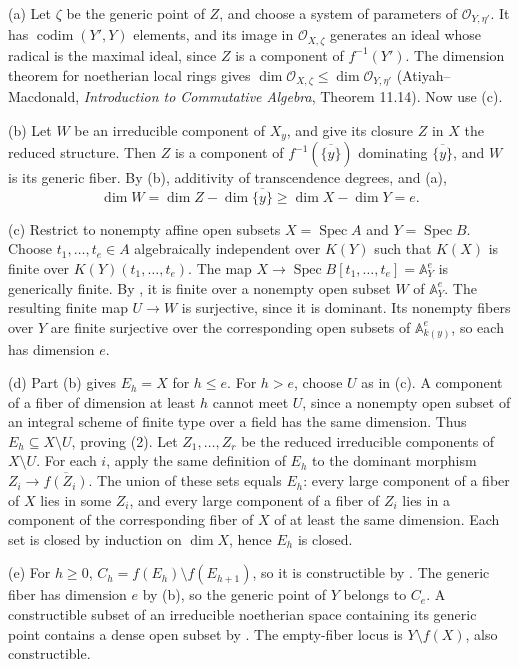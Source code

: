(a) Let $\zeta$ be the generic point of $Z$, and choose a system of parameters of $\mathcal O_{Y,\eta'}$. It has $\operatorname{codim}(Y',Y)$ elements, and its image in $\mathcal O_{X,\zeta}$ generates an ideal whose radical is the maximal ideal, since $Z$ is a component of $f^{-1}(Y')$. The dimension theorem for noetherian local rings gives $\dim\mathcal O_{X,\zeta}\le\dim\mathcal O_{Y,\eta'}$ (Atiyah--Macdonald, \emph{Introduction to Commutative Algebra}, Theorem 11.14). Now use (c).

(b) Let $W$ be an irreducible component of $X_y$, and give its closure $Z$ in $X$ the reduced structure. Then $Z$ is a component of $f^{-1}(\overline{\{y\}})$ dominating $\overline{\{y\}}$, and $W$ is its generic fiber. By (b), additivity of transcendence degrees, and (a),
\[\dim W=\dim Z-\dim\overline{\{y\}}\ge\dim X-\dim Y=e.\]

(c) Restrict to nonempty affine open subsets $X=\operatorname{Spec}A$ and $Y=\operatorname{Spec}B$. Choose $t_1,\ldots,t_e\in A$ algebraically independent over $K(Y)$ such that $K(X)$ is finite over $K(Y)(t_1,\ldots,t_e)$. The map $X\to\operatorname{Spec}B[t_1,\ldots,t_e]=\mathbb A_Y^e$ is generically finite. By , it is finite over a nonempty open subset $W$ of $\mathbb A_Y^e$. The resulting finite map $U\to W$ is surjective, since it is dominant. Its nonempty fibers over $Y$ are finite surjective over the corresponding open subsets of $\mathbb A_{k(y)}^e$, so each has dimension $e$.

(d) Part (b) gives $E_h=X$ for $h\le e$. For $h>e$, choose $U$ as in (c). A component of a fiber of dimension at least $h$ cannot meet $U$, since a nonempty open subset of an integral scheme of finite type over a field has the same dimension. Thus $E_h\subseteq X\setminus U$, proving (2). Let $Z_1,\ldots,Z_r$ be the reduced irreducible components of $X\setminus U$. For each $i$, apply the same definition of $E_h$ to the dominant morphism $Z_i\to\overline{f(Z_i)}$. The union of these sets equals $E_h$: every large component of a fiber of $X$ lies in some $Z_i$, and every large component of a fiber of $Z_i$ lies in a component of the corresponding fiber of $X$ of at least the same dimension. Each set is closed by induction on $\dim X$, hence $E_h$ is closed.

(e) For $h\ge0$, $C_h=f(E_h)\setminus f(E_{h+1})$, so it is constructible by . The generic fiber has dimension $e$ by (b), so the generic point of $Y$ belongs to $C_e$. A constructible subset of an irreducible noetherian space containing its generic point contains a dense open subset by . The empty-fiber locus is $Y\setminus f(X)$, also constructible.
